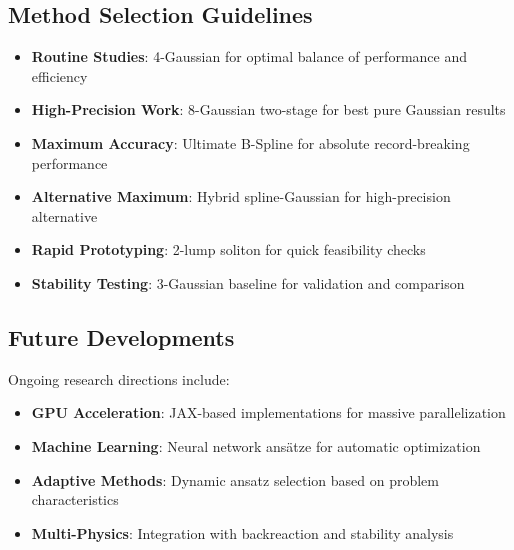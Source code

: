 \documentclass[12pt]{article}
\begin{document}
\subsection{Method Selection Guidelines}

\begin{itemize}
\item \textbf{Routine Studies}: 4-Gaussian for optimal balance of performance and efficiency
\item \textbf{High-Precision Work}: 8-Gaussian two-stage for best pure Gaussian results
\item \textbf{Maximum Accuracy}: Ultimate B-Spline for absolute record-breaking performance
\item \textbf{Alternative Maximum}: Hybrid spline-Gaussian for high-precision alternative
\item \textbf{Rapid Prototyping}: 2-lump soliton for quick feasibility checks
\item \textbf{Stability Testing}: 3-Gaussian baseline for validation and comparison
\end{itemize}

\subsection{Future Developments}

Ongoing research directions include:
\begin{itemize}
\item \textbf{GPU Acceleration}: JAX-based implementations for massive parallelization
\item \textbf{Machine Learning}: Neural network ansätze for automatic optimization
\item \textbf{Adaptive Methods}: Dynamic ansatz selection based on problem characteristics
\item \textbf{Multi-Physics}: Integration with backreaction and stability analysis
\end{itemize}
\end{document}
